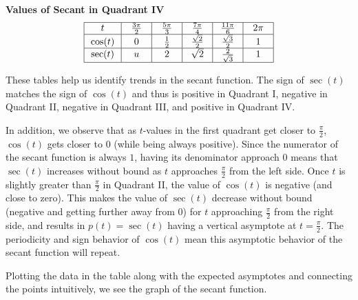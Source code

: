 \documentclass[nooutcomes, noauthor]{ximera}
\begin{document}
\begin{center}
\textbf{Values of Secant in Quadrant IV}
\renewcommand*{\arraystretch}{2.5}
\setlength{\arrayrulewidth}{0.5mm}
\setlength{\tabcolsep}{18pt}
\[
\begin{array}{|>{\centering\arraybackslash$} p{1cm} <{$} | >{\centering\arraybackslash$} p{.75cm} <{$} |  >{\centering\arraybackslash$} p{.75cm} <{$} |  >{\centering\arraybackslash$} p{.75cm} <{$} |  >{\centering\arraybackslash$} p{.75cm} <{$} |  >{\centering\arraybackslash$} p{.75cm} <{$} |}
\hline 
t & \frac{3\pi}{2} & \frac{5\pi}{3} & \frac{7\pi}{4} & \frac{11\pi}{6} & 2\pi\\
\hline
\cos(t) & 0 & \frac{1}{2} &\frac{\sqrt{2}}{2} & \frac{\sqrt{3}}{2} & 1\\
\hline
\sec(t) & u & 2& \sqrt{2} & \frac{2}{\sqrt{3}}& 1\\
\hline 
\end{array}
\]
\end{center}

These tables help us identify trends in the secant function.  The sign of \(\sec(t)\) matches the sign of \(\cos(t)\) and thus is positive in Quadrant I, negative in Quadrant II, negative in Quadrant III, and positive in Quadrant IV.

In addition, we observe that as \(t\)-values in the first quadrant get closer to \(\frac{\pi}{2}\), \(\cos(t)\) gets closer to \(0\) (while being always positive).  Since the numerator of the secant function is always \(1\), having its denominator approach \(0\) means that \(\sec(t)\) increases without bound as \(t\) approaches \(\frac{\pi}{2}\) from the left side.  Once \(t\) is slightly greater than \(\frac{\pi}{2}\) in Quadrant II, the value of \(\cos(t)\) is negative (and close to zero).  This makes the value of \(\sec(t)\) decrease without bound (negative and getting further away from \(0\)) for \(t\) approaching \(\frac{\pi}{2}\) from the right side, and results in \(p(t) = \sec(t)\) having a vertical asymptote at \(t = \frac{\pi}{2}\).  The periodicity and sign behavior of \(\cos(t)\) mean this asymptotic behavior of the secant function will repeat.

Plotting the data in the table along with the expected asymptotes and connecting the points intuitively, we see the graph of the secant function.
\end{document}
